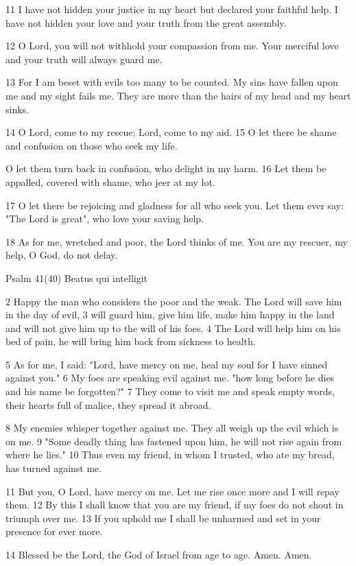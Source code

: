 11 I have not hidden your justice in my heart
but declared your faithful help.
I have not hidden your love and your truth
from the great assembly.

12 O Lord, you will not withhold
your compassion from me.
Your merciful love and your truth
will always guard me.

13 For I am beset with evils
too many to be counted.
My sins have fallen upon me
and my sight fails me.
They are more than the hairs of my head
and my heart sinks.

14 O Lord, come to my rescue;
Lord, come to my aid.
15 O let there be shame and confusion
on those who seek my life.

O let them turn back in confusion,
who delight in my harm.
16 Let them be appalled, covered with shame,
who jeer at my lot.

17 O let there be rejoicing and gladness
for all who seek you.
Let them ever say: "The Lord is great",
who love your saving help.

18 As for me, wretched and poor,
the Lord thinks of me.
You are my rescuer, my help,
O God, do not delay.


Psalm 41(40) Beatus qui intelligit

2 Happy the man who considers the poor and the weak.
The Lord will save him in the day of evil,
3 will guard him, give him life, make him happy in the land
and will not give him up to the will of his foes.
4 The Lord will help him on his bed of pain,
he will bring him back from sickness to health.

5 As for me, I said: "Lord, have mercy on me,
heal my soul for I have sinned against you."
6 My foes are speaking evil against me.
"how long before he dies and his name be forgotten?"
7 They come to visit me and speak empty words,
their hearts full of malice, they spread it abroad.

8 My enemies whisper together against me.
They all weigh up the evil which is on me.
9 "Some deadly thing has fastened upon him,
he will not rise again from where he lies."
10 Thus even my friend, in whom I trusted,
who ate my bread, has turned against me.

11 But you, O Lord, have mercy on me.
Let me rise once more and I will repay them.
12 By this I shall know that you are my friend,
if my foes do not shout in triumph over me.
13 If you uphold me I shall be unharmed
and set in your presence for ever more.


14 Blessed be the Lord, the God of Israel
from age to age. Amen. Amen.
